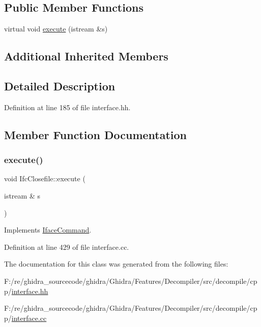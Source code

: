 \subsection*{Public Member Functions}
\begin{DoxyCompactItemize}
\item 
virtual void \mbox{\hyperlink{class_ifc_closefile_afb061815b1fae3cf300afb8a179a6deb}{execute}} (istream \&s)
\end{DoxyCompactItemize}
\subsection*{Additional Inherited Members}


\subsection{Detailed Description}


Definition at line 185 of file interface.\+hh.



\subsection{Member Function Documentation}
\mbox{\label{class_ifc_closefile_afb061815b1fae3cf300afb8a179a6deb}} 
\subsubsection{\texorpdfstring{execute()}{execute()}}
{\footnotesize\ttfamily void Ifc\+Closefile\+::execute (\begin{DoxyParamCaption}\item[{istream \&}]{s }\end{DoxyParamCaption})\hspace{0.3cm}{\ttfamily [virtual]}}



Implements \mbox{\hyperlink{class_iface_command_af10e29cee2c8e419de6efe9e680ad201}{Iface\+Command}}.



Definition at line 429 of file interface.\+cc.



The documentation for this class was generated from the following files\+:\begin{DoxyCompactItemize}
\item 
F\+:/re/ghidra\+\_\+sourcecode/ghidra/\+Ghidra/\+Features/\+Decompiler/src/decompile/cpp/\mbox{\hyperlink{interface_8hh}{interface.\+hh}}\item 
F\+:/re/ghidra\+\_\+sourcecode/ghidra/\+Ghidra/\+Features/\+Decompiler/src/decompile/cpp/\mbox{\hyperlink{interface_8cc}{interface.\+cc}}\end{DoxyCompactItemize}

